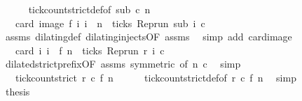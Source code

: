 \begin{isabellebody}
\ \ \ \ \isamarkupfalse%
\ tick{\isacharunderscore}count{\isacharunderscore}strict{\isacharunderscore}def{\isacharbrackleft}of\ {\isacartoucheopen}sub{\isacartoucheclose}\ {\isacartoucheopen}c{\isacartoucheclose}\ {\isacartoucheopen}n{\isacartoucheclose}{\isacharbrackright}\ \isacommand{{\isachardot}}\isamarkupfalse%
\isanewline
\ \ \isamarkupfalse%
\ \isamarkupfalse%
\ {\isacartoucheopen}{\isachardot}{\isachardot}{\isachardot}\ {\isacharequal}\ card\ {\isacharparenleft}image\ f\ {\isacharbraceleft}i{\isachardot}\ i\ {\isacharless}\ n\ {\isasymand}\ ticks\ {\isacharparenleft}{\isacharparenleft}Rep{\isacharunderscore}run\ sub{\isacharparenright}\ i\ c{\isacharparenright}{\isacharbraceright}{\isacharparenright}{\isacartoucheclose}\isanewline
\ \ \ \ \isamarkupfalse%
\ assms\ dilating{\isacharunderscore}def\ dilating{\isacharunderscore}injects{\isacharbrackleft}OF\ assms{\isacharbrackright}\ \isamarkupfalse%
\ {\isacharparenleft}simp\ add{\isacharcolon}\ card{\isacharunderscore}image{\isacharparenright}\isanewline
\ \ \isamarkupfalse%
\ \isamarkupfalse%
\ {\isacartoucheopen}{\isachardot}{\isachardot}{\isachardot}\ {\isacharequal}\ card\ {\isacharbraceleft}i{\isachardot}\ i\ {\isacharless}\ f\ n\ {\isasymand}\ ticks\ {\isacharparenleft}{\isacharparenleft}Rep{\isacharunderscore}run\ r{\isacharparenright}\ i\ c{\isacharparenright}{\isacharbraceright}{\isacartoucheclose}\isanewline
\ \ \ \ \isamarkupfalse%
\ dilated{\isacharunderscore}strict{\isacharunderscore}prefix{\isacharbrackleft}OF\ assms{\isacharcomma}\ symmetric{\isacharcomma}\ of\ {\isacartoucheopen}n{\isacartoucheclose}\ {\isacartoucheopen}c{\isacartoucheclose}{\isacharbrackright}\ \isamarkupfalse%
\ simp\isanewline
\ \ \isamarkupfalse%
\ \isamarkupfalse%
\ {\isacartoucheopen}{\isachardot}{\isachardot}{\isachardot}\ {\isacharequal}\ tick{\isacharunderscore}count{\isacharunderscore}strict\ r\ c\ {\isacharparenleft}f\ n{\isacharparenright}{\isacartoucheclose}\isanewline
\ \ \ \ \isamarkupfalse%
\ tick{\isacharunderscore}count{\isacharunderscore}strict{\isacharunderscore}def{\isacharbrackleft}of\ {\isacartoucheopen}r{\isacartoucheclose}\ {\isacartoucheopen}c{\isacartoucheclose}\ {\isacartoucheopen}f\ n{\isacartoucheclose}{\isacharbrackright}\ \isamarkupfalse%
\ simp\isanewline
\ \ \isamarkupfalse%
\ \isamarkupfalse%
\ {\isacharquery}thesis\ \isacommand{{\isachardot}}\isamarkupfalse%

\end{isabellebody}
